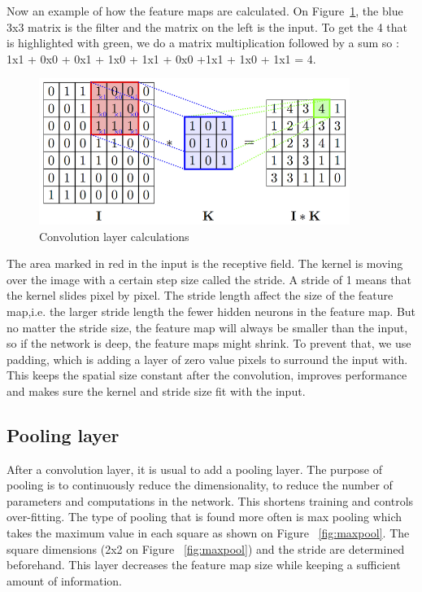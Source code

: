 	Now an example of how the feature maps are calculated. On Figure~\ref{fig:conv_layer}, the blue 3x3 matrix is the filter and the matrix on the left is the input. To get the 4 that is highlighted with green, we do a matrix multiplication followed by a sum so : 1x1 + 0x0 + 0x1 + 1x0 + 1x1 + 0x0 +1x1 + 1x0 + 1x1 = 4. 
	\begin{figure}[!htp]
    \centering
        \includegraphics[width=0.9\textwidth]{./figures/02-conv_layer}
        \caption{Convolution layer calculations}\label{fig:conv_layer}
    \end{figure}
    
	The area marked  in  red in the input is the receptive field. The kernel is moving over the image with a certain step size called the stride. A stride of 1 means that the kernel slides pixel by pixel. The stride length affect the size of the feature map,i.e. the larger stride length the fewer hidden neurons in the feature map. But no matter the stride size, the feature map will always be smaller than the input, so if the network is deep, the feature maps might shrink. To prevent that, we use padding, which is adding a layer of zero value pixels to surround the input with. This keeps the spatial size constant after the convolution, improves performance and makes sure the kernel and stride size fit with the input. 

\subsection{Pooling layer}
After a convolution layer, it is usual to add a pooling layer. The purpose of pooling is to continuously reduce the dimensionality, to reduce the number of parameters and computations in the network. This shortens training and controls over-fitting.
The type of pooling that is found more often is max pooling which takes the maximum value in each square as shown on Figure ~\ref{fig:maxpool}. The square dimensions (2x2 on Figure ~\ref{fig:maxpool})  and the stride are determined beforehand. This layer decreases the feature map size while keeping a sufficient amount of information. 

